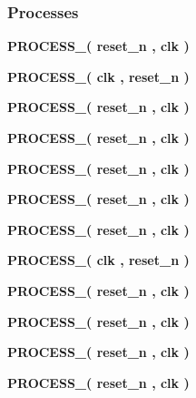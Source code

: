\subsubsection*{Processes}
 \begin{DoxyCompactItemize}
\item 
{\bf P\+R\+O\+C\+E\+S\+S\+\_}{\bfseries  ( {\bfseries {\bfseries {\bf reset\+\_\+n}} \textcolor{vhdlchar}{ }} , {\bfseries {\bfseries {\bf clk}} \textcolor{vhdlchar}{ }} )}
\item 
{\bf P\+R\+O\+C\+E\+S\+S\+\_}{\bfseries  ( {\bfseries {\bfseries {\bf clk}} \textcolor{vhdlchar}{ }} , {\bfseries {\bfseries {\bf reset\+\_\+n}} \textcolor{vhdlchar}{ }} )}
\item 
{\bf P\+R\+O\+C\+E\+S\+S\+\_}{\bfseries  ( {\bfseries {\bfseries {\bf reset\+\_\+n}} \textcolor{vhdlchar}{ }} , {\bfseries {\bfseries {\bf clk}} \textcolor{vhdlchar}{ }} )}
\item 
{\bf P\+R\+O\+C\+E\+S\+S\+\_}{\bfseries  ( {\bfseries {\bfseries {\bf reset\+\_\+n}} \textcolor{vhdlchar}{ }} , {\bfseries {\bfseries {\bf clk}} \textcolor{vhdlchar}{ }} )}
\item 
{\bf P\+R\+O\+C\+E\+S\+S\+\_}{\bfseries  ( {\bfseries {\bfseries {\bf reset\+\_\+n}} \textcolor{vhdlchar}{ }} , {\bfseries {\bfseries {\bf clk}} \textcolor{vhdlchar}{ }} )}
\item 
{\bf P\+R\+O\+C\+E\+S\+S\+\_}{\bfseries  ( {\bfseries {\bfseries {\bf reset\+\_\+n}} \textcolor{vhdlchar}{ }} , {\bfseries {\bfseries {\bf clk}} \textcolor{vhdlchar}{ }} )}
\item 
{\bf P\+R\+O\+C\+E\+S\+S\+\_}{\bfseries  ( {\bfseries {\bfseries {\bf reset\+\_\+n}} \textcolor{vhdlchar}{ }} , {\bfseries {\bfseries {\bf clk}} \textcolor{vhdlchar}{ }} )}
\item 
{\bf P\+R\+O\+C\+E\+S\+S\+\_}{\bfseries  ( {\bfseries {\bfseries {\bf clk}} \textcolor{vhdlchar}{ }} , {\bfseries {\bfseries {\bf reset\+\_\+n}} \textcolor{vhdlchar}{ }} )}
\item 
{\bf P\+R\+O\+C\+E\+S\+S\+\_}{\bfseries  ( {\bfseries {\bfseries {\bf reset\+\_\+n}} \textcolor{vhdlchar}{ }} , {\bfseries {\bfseries {\bf clk}} \textcolor{vhdlchar}{ }} )}
\item 
{\bf P\+R\+O\+C\+E\+S\+S\+\_}{\bfseries  ( {\bfseries {\bfseries {\bf reset\+\_\+n}} \textcolor{vhdlchar}{ }} , {\bfseries {\bfseries {\bf clk}} \textcolor{vhdlchar}{ }} )}
\item 
{\bf P\+R\+O\+C\+E\+S\+S\+\_}{\bfseries  ( {\bfseries {\bfseries {\bf reset\+\_\+n}} \textcolor{vhdlchar}{ }} , {\bfseries {\bfseries {\bf clk}} \textcolor{vhdlchar}{ }} )}
\item 
{\bf P\+R\+O\+C\+E\+S\+S\+\_}{\bfseries  ( {\bfseries {\bfseries {\bf reset\+\_\+n}} \textcolor{vhdlchar}{ }} , {\bfseries {\bfseries {\bf clk}} \textcolor{vhdlchar}{ }} )}
\end{DoxyCompactItemize}
